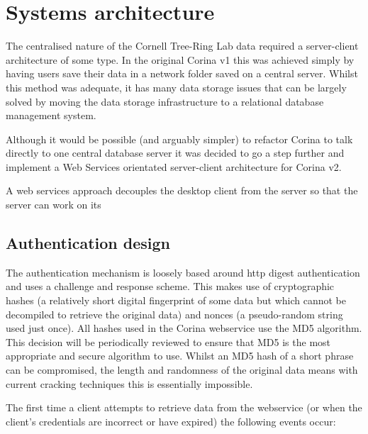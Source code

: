 
\chapter{Systems architecture}

The centralised nature of the Cornell Tree-Ring Lab data required a server-client architecture of some type. In the original Corina v1 this was achieved simply by having users save their data in a network folder saved on a central server. Whilst this method was adequate, it has many data storage issues that can be largely solved by moving the data storage infrastructure to a relational database management system.  

Although it would be possible (and arguably simpler) to refactor Corina to talk directly to one central database server it was decided to go a step further and implement a Web Services orientated server-client architecture for Corina v2.  

A web services approach decouples the desktop client from the server so that the server can work on its 

\section{Authentication design}
\label{txt:authentication}


The authentication mechanism is loosely based around http digest authentication and uses a challenge and response scheme. This makes use of cryptographic hashes (a relatively short digital fingerprint of some data but which cannot be decompiled to retrieve the original data) and nonces (a pseudo-random string used just once). All hashes used in the Corina webservice use the MD5 algorithm. This decision will be periodically reviewed to ensure that MD5 is the most appropriate and secure algorithm to use. Whilst an MD5 hash of a short phrase can be compromised, the length and randomness of the original data means with current cracking techniques this is essentially impossible.

The first time a client attempts to retrieve data from the webservice (or when the client's credentials are incorrect or have expired) the following events occur:


